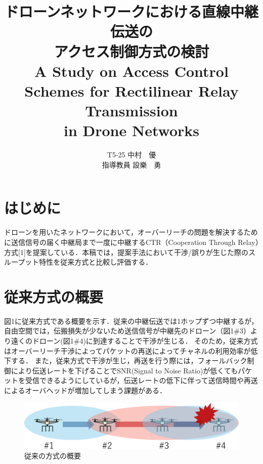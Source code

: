 \documentclass[a4paper,10pt]{ltjsarticle}
\title{\huge ドローンネットワークにおける直線中継伝送の\\アクセス制御方式の検討\\
\Large A Study on Access Control Schemes for Rectilinear Relay Transmission \\in Drone Networks
}
\author{
T5-25 \:中村　優\\
指導教員 \: 設樂　勇
}
\date{}
\begin{document}
\twocolumn[
\maketitle
]

\section{はじめに}
ドローンを用いたネットワークにおいて，オーバーリーチの問題を解決するために送信信号の届く中継局まで一度に中継するCTR（Cooperation Through Relay）方式[1]を提案している．本稿では，提案手法において干渉/誤りが生じた際のスループット特性を従来方式と比較し評価する．

\section{従来方式の概要}
図1に従来方式である概要を示す．従来の中継伝送では1ホップずつ中継するが，自由空間では，伝搬損失が少ないため送信信号が中継先のドローン（図1\#3）より遠くのドローン(図1\#4)に到達することで干渉が生じる．
そのため，従来方式はオーバーリーチ干渉によってパケットの再送によってチャネルの利用効率が低下する．
また，従来方式で干渉が生じ，再送を行う際には，フォールバック制御により伝送レートを下げることでSNR(Signal to Noise Ratio)が低くてもパケットを受信できるようにしているが，伝送レートの低下に伴って送信時間や再送によるオーバヘッドが増加してしまう課題がある．%

\begin{figure}[H]
  \centering
  \includegraphics[width=\linewidth]{cenventional_topology.pdf} %
  \caption{従来の方式の概要}
  \label{fig:従来の方式のトポロジー} %
\end{figure}
\end{document}
